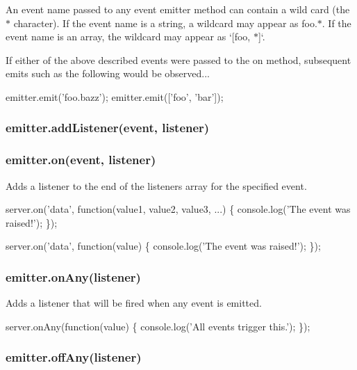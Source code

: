 An event name passed to any event emitter method can contain a wild card (the {\ttfamily $\ast$} character). If the event name is a string, a wildcard may appear as {\ttfamily foo.$\ast$}. If the event name is an array, the wildcard may appear as `\mbox{[}\textquotesingle{}foo\textquotesingle{}, \textquotesingle{}$\ast$\textquotesingle{}\mbox{]}`.

If either of the above described events were passed to the {\ttfamily on} method, subsequent emits such as the following would be observed...


\begin{DoxyCode}
emitter.emit('foo.bazz');
emitter.emit(['foo', 'bar']);
\end{DoxyCode}


\subsubsection*{emitter.\+add\+Listener(event, listener)}

\subsubsection*{emitter.\+on(event, listener)}

Adds a listener to the end of the listeners array for the specified event.


\begin{DoxyCode}
server.on('data', function(value1, value2, value3, ...) \{
  console.log('The event was raised!');
\});
\end{DoxyCode}



\begin{DoxyCode}
server.on('data', function(value) \{
  console.log('The event was raised!');
\});
\end{DoxyCode}


\subsubsection*{emitter.\+on\+Any(listener)}

Adds a listener that will be fired when any event is emitted.


\begin{DoxyCode}
server.onAny(function(value) \{
  console.log('All events trigger this.');
\});
\end{DoxyCode}


\subsubsection*{emitter.\+off\+Any(listener)}


